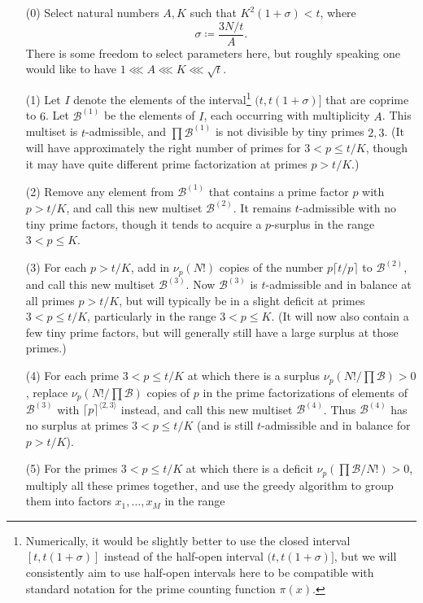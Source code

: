 \documentclass[12pt,a4paper,reqno]{amsart}
\numberwithin{equation}{section}
\theoremstyle{plain}
\theoremstyle{definition}
\newcommand\tuple{{\mathcal B}}
\begin{document}
\begin{enumerate}
\item[(0)] Select natural numbers $A,K$ such that $K^2 (1+\sigma) < t$, where
\begin{equation}\label{nu-def}
  \sigma \coloneqq \frac{3N/t}{A}.
\end{equation}  
There is some freedom to select parameters here, but roughly speaking one would like to have $1 \lll A \lll K \lll \sqrt{t}$.
\item[(1)] Let $I$ denote the elements of the interval\footnote{Numerically, it would be slightly better to use the closed interval $[t,t(1+\sigma)]$ instead of the half-open interval $(t,t(1+\sigma)]$, but we will consistently aim to use half-open intervals here to be compatible with standard notation for the prime counting function $\pi(x)$.} $(t,t(1+\sigma)]$ that are coprime to $6$.  Let $\tuple^{(1)}$ be the elements of $I$, each occurring with multiplicity $A$.  This multiset is $t$-admissible, and $\prod \tuple^{(1)}$ is not divisible by tiny primes $2,3$.  (It will have approximately the right number of primes for $3 < p \leq t/K$, though it may have quite different prime factorization at primes $p>t/K$.)
\item[(2)] Remove any element from $\tuple^{(1)}$ that contains a prime factor $p$ with $p > t/K$, and call this new multiset $\tuple^{(2)}$.  It remains $t$-admissible with no tiny prime factors, though it tends to acquire a $p$-surplus in the range $3 < p \leq K$.
\item[(3)] For each $p > t/K$, add in $\nu_p(N!)$ copies of the number $p \lceil t/p \rceil$ to $\tuple^{(2)}$, and call this new multiset $\tuple^{(3)}$.   Now $\tuple^{(3)}$ is $t$-admissible and in balance at all primes $p>t/K$, but will typically be in a slight deficit at primes $3 < p \leq t/K$, particularly in the range $3 < p \leq K$.  (It will now also contain a few tiny prime factors, but will generally still have a large surplus at those primes.)
\item[(4)] For each prime $3 < p \leq t/K$ at which there is a surplus $\nu_p(N!/\prod \tuple) > 0$, replace $\nu_p(N!/\prod \tuple)$ copies of $p$ in the prime factorizations of elements of $\tuple^{(3)}$ with $\lceil p \rceil^{\langle 2,3 \rangle}$ instead, and call this new multiset $\tuple^{(4)}$.  Thus $\tuple^{(4)}$ has no surplus at primes $3 < p \leq t/K$ (and is still $t$-admissible and in balance for $p>t/K$).
\item [(5)]For the primes $3 < p \leq t/K$ at which there is a deficit $\nu_p(\prod \tuple/N!) > 0$, multiply all these primes together, and use the greedy algorithm to group them into factors $x_1, \dots, x_M$ in the range

\end{enumerate}
\end{document}
